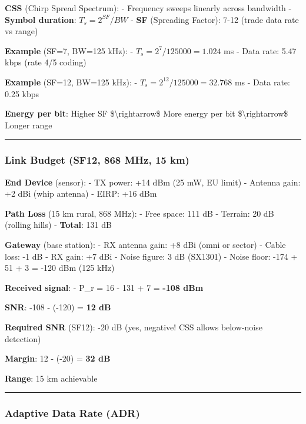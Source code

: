 \textbf{CSS} (Chirp Spread Spectrum): - Frequency sweeps linearly across
bandwidth - \textbf{Symbol duration}: \(T_s = 2^{SF} / BW\) -
\textbf{SF} (Spreading Factor): 7-12 (trade data rate vs range)

\textbf{Example} (SF=7, BW=125 kHz): - \(T_s = 2^7 / 125000 = 1.024\) ms
- Data rate: 5.47 kbps (rate 4/5 coding)

\textbf{Example} (SF=12, BW=125 kHz): -
\(T_s = 2^{12} / 125000 = 32.768\) ms - Data rate: 0.25 kbps

\textbf{Energy per bit}: Higher SF \$\textbackslash rightarrow\$ More
energy per bit \$\textbackslash rightarrow\$ Longer range

\begin{center}\rule{0.5\linewidth}{0.5pt}\end{center}

\subsubsection{Link Budget (SF12, 868 MHz, 15
km)}\label{link-budget-sf12-868-mhz-15-km}

\textbf{End Device} (sensor): - TX power: +14 dBm (25 mW, EU limit) -
Antenna gain: +2 dBi (whip antenna) - EIRP: +16 dBm

\textbf{Path Loss} (15 km rural, 868 MHz): - Free space: 111 dB -
Terrain: 20 dB (rolling hills) - \textbf{Total}: 131 dB

\textbf{Gateway} (base station): - RX antenna gain: +8 dBi (omni or
sector) - Cable loss: -1 dB - RX gain: +7 dBi - Noise figure: 3 dB
(SX1301) - Noise floor: -174 + 51 + 3 = -120 dBm (125 kHz)

\textbf{Received signal}: - P\_r = 16 - 131 + 7 = \textbf{-108 dBm}

\textbf{SNR}: -108 - (-120) = \textbf{12 dB}

\textbf{Required SNR} (SF12): -20 dB (yes, negative! CSS allows
below-noise detection)

\textbf{Margin}: 12 - (-20) = \textbf{32 dB}

\textbf{Range}: 15 km achievable

\begin{center}\rule{0.5\linewidth}{0.5pt}\end{center}

\subsubsection{Adaptive Data Rate (ADR)}\label{adaptive-data-rate-adr}

